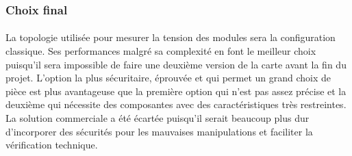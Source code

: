 	\subsubsection*{Choix final}
	\paragraph*{}	
	La topologie utilisée pour mesurer la tension des modules sera la configuration classique. Ses performances malgré sa complexité en font le meilleur choix puisqu'il sera impossible de faire une deuxième version de la carte avant la fin du projet. L'option la plus sécuritaire, éprouvée et qui permet un grand choix de pièce est plus avantageuse que la première option qui n'est pas assez précise et la deuxième qui nécessite des composantes avec des caractéristiques très restreintes. La solution commerciale a été écartée puisqu'il serait beaucoup plus dur d'incorporer des sécurités pour les mauvaises manipulations et faciliter la vérification technique.	